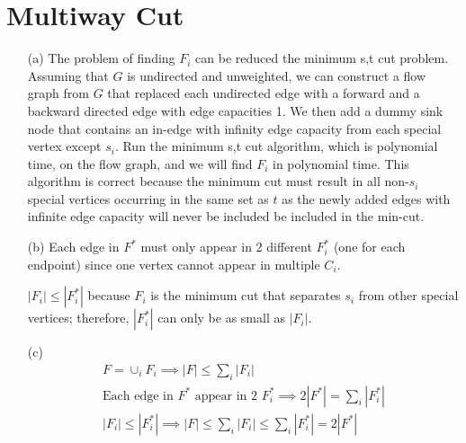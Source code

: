 \documentclass[11pt]{article}
\theoremstyle{definition}
\theoremstyle{remark}
\begin{document}
\section{Multiway Cut}
\begin{enumerate}
\item[(a)]
The problem of finding $F_i$ can be reduced the minimum s,t cut problem. Assuming that $G$ is undirected and unweighted, we can construct a flow graph from $G$ that replaced each undirected edge with a forward and a backward directed edge with edge capacities 1. We then add a dummy sink node that contains an in-edge with infinity edge capacity from each special vertex except $s_i$. Run the minimum s,t cut algorithm, which is polynomial time, on the flow graph, and we will find $F_i$ in polynomial time. This algorithm is correct because the minimum cut must result in all non-$s_i$ special vertices occurring in the same set as $t$ as the newly added edges with infinite edge capacity will never be included be included in the min-cut.

\item[(b)] 
Each edge in $F^*$ must only appear in 2 different $F_i^*$ (one for each endpoint) since one vertex cannot appear in multiple $C_i$. 

$|F_i| \leq |F_i^*|$ because $F_i$ is the minimum cut that separates $s_i$ from other special vertices; therefore, $|F_i^*|$ can only be as small as $|F_i|$.

\item[(c)]
\begin{align*}
F = \cup_i F_i \implies |F| \leq \sum_i |F_i| \\
\text{Each edge in $F^*$ appear in 2 $F_i^*$} \implies 2|F^*| = \sum_i |F_i^*| \\
|F_i| \leq |F_i^*| \implies |F| \leq \sum_i |F_i| \leq \sum_i |F_i^*| = 2|F^*| \\
\end{align*}
\end{enumerate}
\clearpage
\end{document}
